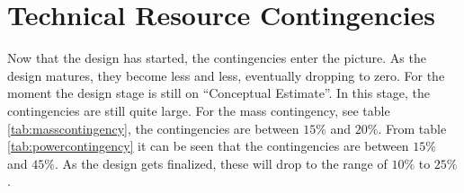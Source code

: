 \section{Technical Resource Contingencies}
\label{blCont}

Now that the design has started, the contingencies enter the picture. As the design matures, they become less and less, eventually dropping to zero. For the moment the design stage is still on ``Conceptual Estimate''. In this stage, the contingencies are still quite large. For the mass contingency, see table \ref{tab:masscontingency}, the contingencies are between $15\%$ and $20\%$. From table \ref{tab:powercontingency} it can be seen that the contingencies are between $15\%$ and $45\%$. As the design gets finalized, these will drop to the range of $10\%$ to $25\%$. 


